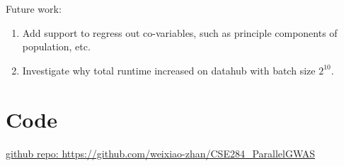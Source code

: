 \documentclass{article}
\begin{document}
Future work: 
\begin{enumerate}
\item Add support to regress out co-variables, such as 
principle components of population, etc.
      
\item Investigate why total runtime increased on datahub with batch size $2^{10}$.
\end{enumerate}

\section{Code}
\href{https://github.com/weixiao-zhan/CSE284_ParallelGWAS}
{github repo: https://github.com/weixiao-zhan/CSE284\_ParallelGWAS}



\end{document}
